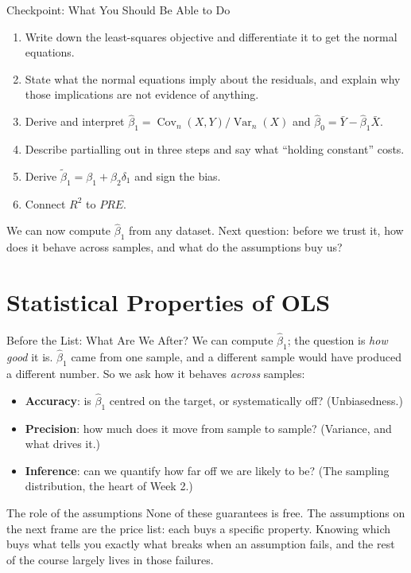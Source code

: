 \documentclass[aspectratio=169,11pt,xcolor=dvipsnames]{beamer}
\DeclareMathOperator{\Cov}{Cov}
\DeclareMathOperator{\Var}{Var}
\begin{document}
\begin{frame}{Checkpoint: What You Should Be Able to Do}
\begin{enumerate}\itemsep4pt
  \item Write down the least-squares objective and differentiate it to get the
        normal equations.
  \item State what the normal equations imply about the residuals, and explain
        why those implications are not evidence of anything.
  \item Derive and interpret
        $\hat\beta_1 = \Cov_n(X,Y)/\Var_n(X)$ and
        $\hat\beta_0 = \bar Y - \hat\beta_1\bar X$.
  \item Describe partialling out in three steps and say what ``holding constant''
        costs.
  \item Derive $\tilde\beta_1 = \beta_1 + \beta_2\delta_1$ and sign the bias.
  \item Connect $R^2$ to $PRE$.
\end{enumerate}
\vskip6pt
\alert{We can now compute $\hat\beta_1$ from any dataset. Next question:
before we trust it, how does it behave across samples, and what do the
assumptions buy us?}
\end{frame}

\section[Properties]{Statistical Properties of OLS}
\begin{frame}\sectionpage\end{frame}

\begin{frame}{Before the List: What Are We After?}
We can compute $\hat\beta_1$; the question is \emph{how good} it is.
$\hat\beta_1$ came from one sample, and a different sample would have produced
a different number. So we ask how it behaves \emph{across} samples:
\begin{itemize}\itemsep3pt
  \item \textbf{Accuracy}: is $\hat\beta_1$ centred on the target, or
        systematically off? (Unbiasedness.)
  \item \textbf{Precision}: how much does it move from sample to sample?
        (Variance, and what drives it.)
  \item \textbf{Inference}: can we quantify how far off we are likely to be?
        (The sampling distribution, the heart of Week 2.)
\end{itemize}
\vskip3pt
\begin{block}{The role of the assumptions}
None of these guarantees is free. The assumptions on the next frame are the
\alert{price list}: each buys a specific property. Knowing which buys what
tells you exactly what breaks when an assumption fails, and the rest of the
course largely lives in those failures.
\end{block}
\end{frame}
\end{document}
